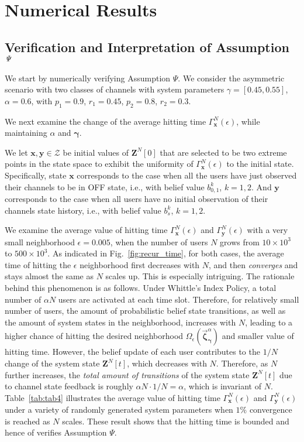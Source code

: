\documentclass[11pt,twocolumn]{IEEEtran}
\begin{document}
\section{Numerical Results}

\subsection{Verification and Interpretation of Assumption $\it \Psi$}
\label{sec:num:just}

We start by numerically verifying Assumption $\Psi$. We consider
the asymmetric scenario with two classes of channels with system
parameters $\gamma{=}[0.45, 0.55]$,
$\alpha{=}0.6$, with $p_1{=}0.9$, $r_1{=}0.45$, $p_2{=}0.8$, $r_2{=}0.3$.

We next examine the change of the average hitting time $\Gamma_{\bm x}^N(\epsilon)$, while maintaining $\alpha$ and $\bm \gamma$.

We let $\bm x, \bm y \in \mathcal{Z}$ be initial values of $\bm Z^N[0]$ that are selected to be two extreme points in the state space to exhibit the uniformity of $\Gamma^N_{\bm x}(\epsilon)$ to the initial state. Specifically, state $\bm x$ corresponds to the
case when all the users have just observed their channels to be in
OFF state, i.e., with belief value $b^k_{0,1}$, $k=1,2$. And $\bm y$
corresponds to the case when all users have no initial observation
of their channels state history, i.e., with belief value $b^k_s$,
$k=1,2$.

We examine the average value of hitting time $\Gamma_{\bm
x}^N(\epsilon)$ and $\Gamma^N_{\bm y}(\epsilon)$ with a very small
neighborhood $\epsilon{=}0.005$, when the number of users $N$ grows from $10{\times} 10^3$ to $500{\times}10^3$. As indicated in Fig.~\ref{fig:recur_time}, for both cases, the average time of hitting the $\epsilon$ neighborhood first decreases with $N$, and then \emph{converges} and stays almost the same as $N$ scales up. This is especially
intriguing. The rationale behind this phenomenon is as follows. Under Whittle's Index Policy, a total number of $\alpha N$ users are activated at each time slot. Therefore, for relatively small number of users, the amount of probabilistic belief state transitions, as well as the amount of system states in the neighborhood, increases with $N$, leading to a higher chance of hitting the desired neighborhood
$\Omega_{\epsilon}(\vec{\bm \zeta}^{\alpha}_{\bm \gamma})$ and smaller value of hitting time. However, the belief update of each user
contributes to the $1/N$ change of the system state $\bm Z^N[t]$, which
decreases with $N$. Therefore, as $N$ further increases, the \emph{total amount of transitions} of the system state ${\bm Z}^N[t]$ due to channel state feedback is roughly $\alpha N \cdot
1/N=\alpha$, which is invariant of $N$. Table~\ref{tab:tab4} illustrates the average value of hitting time $\Gamma_{\bm
x}^N(\epsilon)$ and $\Gamma^N_{\bm y}(\epsilon)$ under a variety of randomly generated system parameters when $1\%$ convergence is reached as $N$ scales. These result shows that the hitting time is bounded and hence of verifies Assumption $\Psi$.
\end{document}
